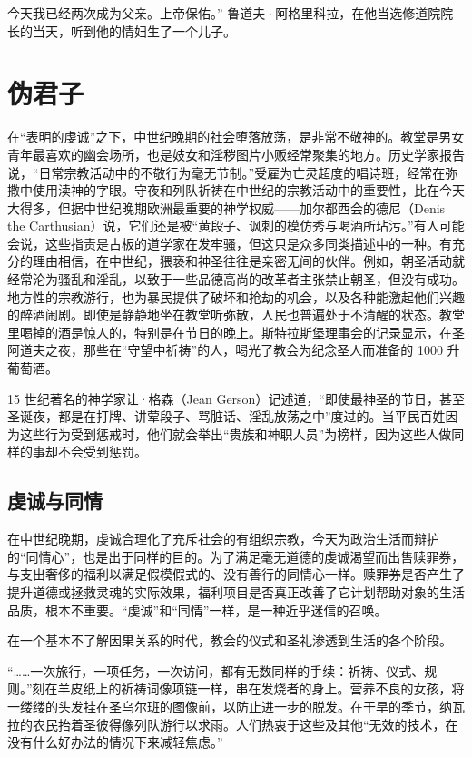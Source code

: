 \begin{tcolorbox}
今天我已经两次成为父亲。上帝保佑。”-鲁道夫·阿格里科拉，在他当选修道院院长的当天，听到他的情妇生了一个儿子。 
\end{tcolorbox}

\section{伪君子}
在“表明的虔诚”之下，中世纪晚期的社会堕落放荡，是非常不敬神的。教堂是男女青年最喜欢的幽会场所，也是妓女和淫秽图片小贩经常聚集的地方。历史学家报告说，“日常宗教活动中的不敬行为毫无节制。”受雇为亡灵超度的唱诗班，经常在弥撒中使用渎神的字眼。守夜和列队祈祷在中世纪的宗教活动中的重要性，比在今天大得多，但据中世纪晚期欧洲最重要的神学权威——加尔都西会的德尼（Denis the Carthusian）说，它们还是被“黄段子、讽刺的模仿秀与喝酒所玷污。”有人可能会说，这些指责是古板的道学家在发牢骚，但这只是众多同类描述中的一种。有充分的理由相信，在中世纪，猥亵和神圣往往是亲密无间的伙伴。例如，朝圣活动就经常沦为骚乱和淫乱，以致于一些品德高尚的改革者主张禁止朝圣，但没有成功。地方性的宗教游行，也为暴民提供了破坏和抢劫的机会，以及各种能激起他们兴趣的醉酒闹剧。即使是静静地坐在教堂听弥散，人民也普遍处于不清醒的状态。教堂里喝掉的酒是惊人的，特别是在节日的晚上。斯特拉斯堡理事会的记录显示，在圣阿道夫之夜，那些在“守望中祈祷”的人，喝光了教会为纪念圣人而准备的 1000 升葡萄酒。

15 世纪著名的神学家让·格森（Jean Gerson）记述道，“即使最神圣的节日，甚至圣诞夜，都是在打牌、讲荤段子、骂脏话、淫乱放荡之中”度过的。当平民百姓因为这些行为受到惩戒时，他们就会举出“贵族和神职人员”为榜样，因为这些人做同样的事却不会受到惩罚。

\subsection{虔诚与同情}
在中世纪晚期，虔诚合理化了充斥社会的有组织宗教，今天为政治生活而辩护的“同情心”，也是出于同样的目的。为了满足毫无道德的虔诚渴望而出售赎罪券，与支出奢侈的福利以满足假模假式的、没有善行的同情心一样。赎罪券是否产生了提升道德或拯救灵魂的实际效果，福利项目是否真正改善了它计划帮助对象的生活品质，根本不重要。“虔诚”和“同情”一样，是一种近乎迷信的召唤。

在一个基本不了解因果关系的时代，教会的仪式和圣礼渗透到生活的各个阶段。

“……一次旅行，一项任务，一次访问，都有无数同样的手续：祈祷、仪式、规则。”刻在羊皮纸上的祈祷词像项链一样，串在发烧者的身上。营养不良的女孩，将一缕缕的头发挂在圣乌尔班的图像前，以防止进一步的脱发。在干旱的季节，纳瓦拉的农民抬着圣彼得像列队游行以求雨。人们热衷于这些及其他“无效的技术，在没有什么好办法的情况下来减轻焦虑。”

